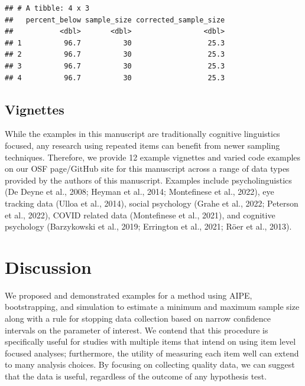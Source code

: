 \documentclass[
  man]{apa7}
\begin{document}
\begin{verbatim}
## # A tibble: 4 x 3
##   percent_below sample_size corrected_sample_size
##           <dbl>       <dbl>                 <dbl>
## 1          96.7          30                  25.3
## 2          96.7          30                  25.3
## 3          96.7          30                  25.3
## 4          96.7          30                  25.3
\end{verbatim}

\hypertarget{vignettes}{%
\subsection{Vignettes}\label{vignettes}}

While the examples in this manuscript are traditionally cognitive linguistics focused, any research using repeated items can benefit from newer sampling techniques. Therefore, we provide 12 example vignettes and varied code examples on our OSF page/GitHub site for this manuscript across a range of data types provided by the authors of this manuscript. Examples include psycholinguistics (De Deyne et al., 2008; Heyman et al., 2014; Montefinese et al., 2022), eye tracking data (Ulloa et al., 2014), social psychology (Grahe et al., 2022; Peterson et al., 2022), COVID related data (Montefinese et al., 2021), and cognitive psychology (Barzykowski et al., 2019; Errington et al., 2021; Röer et al., 2013).

\hypertarget{discussion}{%
\section{Discussion}\label{discussion}}

We proposed and demonstrated examples for a method using AIPE, bootstrapping, and simulation to estimate a minimum and maximum sample size along with a rule for stopping data collection based on narrow confidence intervals on the parameter of interest. We contend that this procedure is specifically useful for studies with multiple items that intend on using item level focused analyses; furthermore, the utility of measuring each item well can extend to many analysis choices. By focusing on collecting quality data, we can suggest that the data is useful, regardless of the outcome of any hypothesis test.
\end{document}
